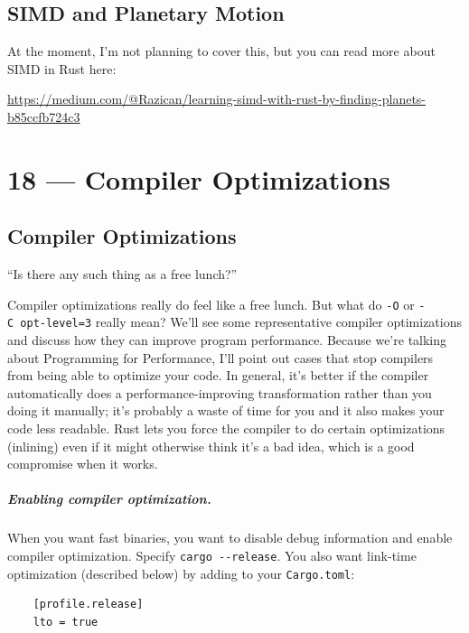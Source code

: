 \documentclass[a4paper]{report}
\begin{document}
\section*{SIMD and Planetary Motion}

At the moment, I'm not planning to cover this, but you can read more about SIMD
in Rust here:
\begin{center}
\url{https://medium.com/@Razican/learning-simd-with-rust-by-finding-planets-b85ccfb724c3}
\end{center}









\chapter*{18 --- Compiler Optimizations}


\section*{Compiler Optimizations}

\hfill ``Is there any such thing as a free lunch?''

Compiler optimizations really do feel like a free lunch.
But what do {\tt -O} or
{\tt -C~opt-level=3} really mean?
We'll see some representative compiler optimizations and discuss how
they can improve program performance. Because we're talking about
Programming for Performance, I'll point out cases that stop compilers
from being able to optimize your code. In general, it's better if the
compiler automatically does a performance-improving transformation
rather than you doing it manually; it's probably a waste of time for
you and it also makes your code less readable. Rust lets you force the compiler to do certain optimizations (inlining) even if it might otherwise think it's a bad idea, which is a good compromise when it works.

\paragraph{Enabling compiler optimization.} When you want fast binaries, you want to disable debug information and enable compiler optimization. Specify \texttt{cargo~-{}-release}. You also want link-time optimization (described below) by adding to your \texttt{Cargo.toml}:
\begin{verbatim}
    [profile.release]
    lto = true
\end{verbatim}
\end{document}
